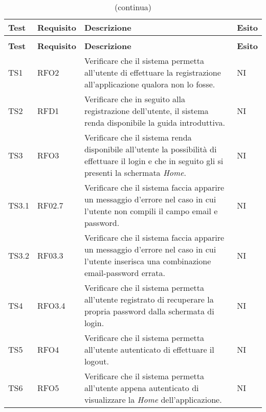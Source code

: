 	\begin{longtable}{ >{\centering}p{} >{\centering}p{} >{\centering}p{}
			>{\centering}p{}}%
			
		\caption{Riepilogo test di sistema}\\	
		\rowcolorhead
		\textbf{\color{white}Test} 
		& \textbf{\color{white}Requisito} 
		& \textbf{\color{white}Descrizione} 
		& \centering\textbf{\color{white}Esito}
		\tabularnewline %
		\endfirsthead	
		
		\rowcolor{white}\caption[]{(continua)}\\	
		\rowcolorhead
		\textbf{\color{white}Test} 
		& \textbf{\color{white}Requisito} 
		& \textbf{\color{white}Descrizione} 
		& \centering\textbf{\color{white}Esito}
		\tabularnewline %
		\endhead	
		
		TS1	& RFO2 & Verificare che il sistema permetta all'utente di effettuare la registrazione all'applicazione qualora non lo fosse. &	NI	\tabularnewline
		
		 TS2	& RFD1 & Verificare che in seguito alla registrazione dell'utente, il sistema renda disponibile la guida introduttiva.	&	NI	\tabularnewline
		 
		 TS3	& RFO3 & Verificare che il sistema renda disponibile all'utente la possibilità di effettuare il login e che in seguito gli si presenti la schermata \textit{Home}. &	NI	\tabularnewline
		 
		 TS3.1 & RF02.7 & Verificare che il sistema faccia apparire un messaggio d'errore nel caso in cui l'utente non compili il campo email e password. &	NI	\tabularnewline
		 
		 TS3.2 & RF03.3 &	Verificare che il sistema faccia apparire un messaggio d'errore nel caso in cui l'utente inserisca una combinazione email-password errata. &	NI	\tabularnewline
		 
		 TS4 & RFO3.4	& Verificare che il sistema permetta all'utente registrato di recuperare la propria password dalla schermata di login.	&	NI	\tabularnewline
		 
		 TS5	& RFO4 & Verificare che il sistema permetta all'utente autenticato di effettuare il logout. &	 NI \tabularnewline
		 
		 TS6	& RFO5 & Verificare che il sistema permetta all'utente appena autenticato di visualizzare la \textit{Home} dell'applicazione. &	NI	\tabularnewline
		 

\end{longtable}
